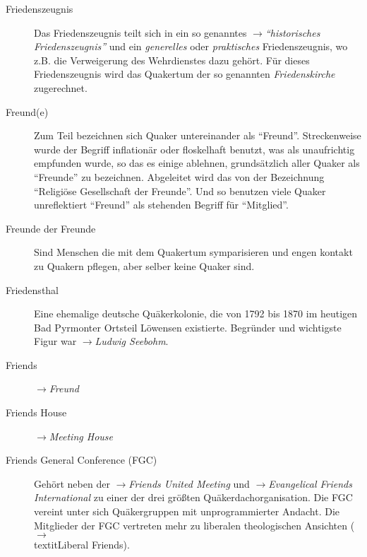 \begin{description}
 \item[Friedenszeugnis] Das Friedenszeugnis teilt sich in ein so genanntes
 $\to$\textit{"`historisches Friedenszeugnis"'} und ein \textit{generelles}
 oder \textit{praktisches} Friedenszeugnis, wo z.B. die Verweigerung des
 Wehrdienstes dazu gehört. Für dieses Friedenszeugnis wird das Quakertum der
 so genannten \textit{Friedenskirche} zugerechnet.

 \item[Freund(e)] Zum Teil bezeichnen sich Quaker untereinander als "`Freund"'.
 Streckenweise wurde der Begriff inflationär oder floskelhaft benutzt, was
 als unaufrichtig empfunden wurde, so das es einige ablehnen, grundsätzlich
 aller Quaker als "`Freunde"' zu bezeichnen. Abgeleitet wird das von der
 Bezeichnung "`Religiöse Gesellschaft der Freunde"'. Und so benutzen viele
 Quaker unreflektiert "`Freund"' als stehenden Begriff für "`Mitglied"'.
 
 \item[Freunde der Freunde] Sind Menschen die mit dem Quakertum symparisieren
 und engen kontakt zu Quakern pflegen, aber selber keine Quaker sind.

 \item[Friedensthal] Eine ehemalige deutsche Quäkerkolonie, die von 1792 bis
 1870 im heutigen Bad Pyrmonter Ortsteil Löwensen existierte. Begründer und
 wichtigste Figur war $\to$\textit{Ludwig Seebohm}.

 \item[Friends] $\to$\textit{Freund}

 \item[Friends House] $\to$\textit{Meeting House}

 \item[Friends General Conference (FGC)] Gehört neben der
 $\to$\textit{Friends United Meeting} und $\to$\textit{Evangelical Friends
 International} zu einer der drei größten Quäkerdachorganisation. Die FGC
 vereint unter sich Quäkergruppen mit unprogrammierter Andacht. Die Mitglieder
 der FGC vertreten mehr zu liberalen theologischen Ansichten
 ($\to$\\textit{Liberal Friends}). 




\end{description}
